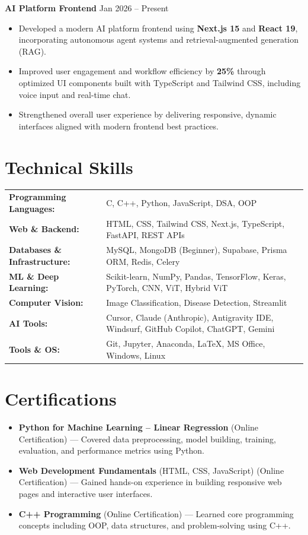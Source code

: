 \documentclass[11pt,letterpaper]{article}
\begin{document}
\vspace{4pt}
\textbf{AI Platform Frontend} \hfill Jan 2026 -- Present
\begin{itemize}
  \item Developed a modern AI platform frontend using \textbf{Next.js 15} and \textbf{React 19}, incorporating autonomous agent systems and retrieval-augmented generation (RAG).
  \item Improved user engagement and workflow efficiency by \textbf{25\%} through optimized UI components built with TypeScript and Tailwind CSS, including voice input and real-time chat.
  \item Strengthened overall user experience by delivering responsive, dynamic interfaces aligned with modern frontend best practices.
\end{itemize}

\section{Technical Skills}
\begin{tabularx}{\textwidth}{@{}l X@{}}
\textbf{Programming Languages:} & C, C++, Python, JavaScript, DSA, OOP \\
\textbf{Web \& Backend:} & HTML, CSS, Tailwind CSS, Next.js, TypeScript, FastAPI, REST APIs \\
\textbf{Databases \& Infrastructure:} & MySQL, MongoDB (Beginner), Supabase, Prisma ORM, Redis, Celery \\
\textbf{ML \& Deep Learning:} & Scikit-learn, NumPy, Pandas, TensorFlow, Keras, PyTorch, CNN, ViT, Hybrid ViT \\
\textbf{Computer Vision:} & Image Classification, Disease Detection, Streamlit \\
\textbf{AI Tools:} & Cursor, Claude (Anthropic), Antigravity IDE, Windsurf, GitHub Copilot, ChatGPT, Gemini \\
\textbf{Tools \& OS:} & Git, Jupyter, Anaconda, \LaTeX, MS Office, Windows, Linux \\
\end{tabularx}

\section{Certifications}
\begin{itemize}
  \item \textbf{Python for Machine Learning -- Linear Regression} (Online Certification) --- Covered data preprocessing, model building, training, evaluation, and performance metrics using Python.
  \item \textbf{Web Development Fundamentals} (HTML, CSS, JavaScript) (Online Certification) --- Gained hands-on experience in building responsive web pages and interactive user interfaces.
  \item \textbf{C++ Programming} (Online Certification) --- Learned core programming concepts including OOP, data structures, and problem-solving using C++.
\end{itemize}
\end{document}
